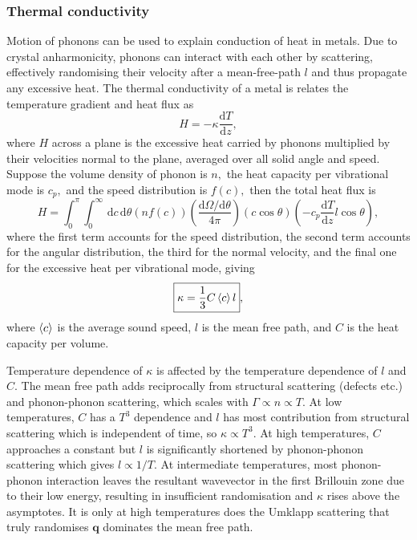 \documentclass{article}
\theoremstyle{nonumberplain}
\begin{document}
\subsubsection{Thermal conductivity}
Motion of phonons can be used to explain conduction of heat in metals. Due to crystal anharmonicity, phonons can interact with each other by scattering, effectively randomising their velocity after a mean-free-path $l$ and thus propagate any excessive heat. The thermal conductivity of a metal is relates the temperature gradient and heat flux as
\[
    H = -\kappa \frac{\mathrm{d}T}{\mathrm{d}z}, 
\] 
where $H$ across a plane is the excessive heat carried by phonons multiplied by their velocities normal to the plane, averaged over all solid angle and speed. Suppose the volume density of phonon is $n,$ the heat capacity per vibrational mode is $c_p,$ and the speed distribution is $f(c),$ then the total heat flux is 
\[
    H = \int_{0}^{\pi } \int_{0}^{\infty } \,\mathrm{d}c \,\mathrm{d}\theta  
    (n f(c) ) \left( \frac{\mathrm{d} \Omega  / \mathrm{d} \theta }{4\pi } \right) (c \cos \theta) \left(- c_p \frac{\mathrm{d}T}{\mathrm{d}z} l \cos \theta \right), 
\]
where the first term accounts for the speed distribution, the second term accounts for the angular distribution, the third for the normal velocity, and the final one for the excessive heat per vibrational mode, giving
\[
    \boxed{\kappa = \frac{1}{3}C \expval{c} l }, 
\]
where $\expval{c}$ is the average sound speed, $l$ is the mean free path, and $C$ is the heat capacity per volume. 

Temperature dependence of $\kappa $ is affected by the temperature dependence of $l$ and $C.$ The mean free path adds reciprocally from structural scattering (defects etc.) and phonon-phonon scattering, which scales with $\Gamma \propto n \propto T.$ At low temperatures, $C$ has a $T^3$ dependence and $l$ has most contribution from structural scattering which is independent of time, so $\kappa \propto T^3.$ At high temperatures, $C$ approaches a constant but $l$ is significantly shortened by phonon-phonon scattering which gives $l\propto 1/T.$ At intermediate temperatures, most phonon-phonon interaction leaves the resultant wavevector in the first Brillouin zone due to their low energy, resulting in insufficient randomisation and $\kappa $ rises above the asymptotes. It is only at high temperatures does the Umklapp scattering that truly randomises $\mathbf{q}$ dominates the mean free path. 
\end{document}
